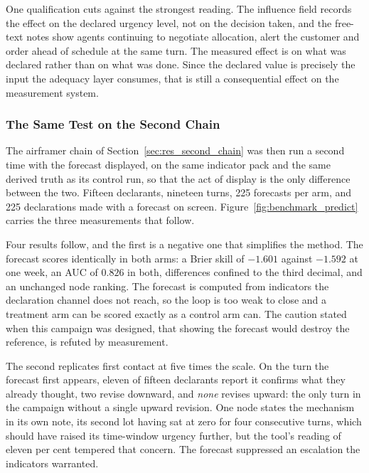 One qualification cuts against the strongest reading. The influence field records the effect
on the declared urgency level, not on the decision taken, and the free-text notes show agents
continuing to negotiate allocation, alert the customer and order ahead of schedule at the same
turn. The measured effect is on what was declared rather than on what was done. Since the
declared value is precisely the input the adequacy layer consumes, that is still a
consequential effect on the measurement system.

\subsubsection{The Same Test on the Second Chain}
\label{sec:res_display_second_chain}

The airframer chain of Section~\ref{sec:res_second_chain} was then run a second time with the
forecast displayed, on the same indicator pack and the same derived truth as its control run,
so that the act of display is the only difference between the two. Fifteen declarants,
nineteen turns, 225 forecasts per arm, and 225 declarations made with a forecast on screen.
Figure~\ref{fig:benchmark_predict} carries the three measurements that follow.

Four results follow, and the first is a negative one that simplifies the method. The forecast
scores identically in both arms: a Brier skill of $-1.601$ against $-1.592$ at one week, an AUC
of $0.826$ in both, differences confined to the third decimal, and an unchanged node ranking.
The forecast is computed from indicators the declaration channel does not reach, so the loop is
too weak to close and a treatment arm can be scored exactly as a control arm can. The caution
stated when this campaign was designed, that showing the forecast would destroy the reference,
is refuted by measurement.

The second replicates first contact at five times the scale. On the turn the forecast first
appears, eleven of fifteen declarants report it confirms what they already thought, two revise
downward, and \emph{none} revises upward: the only turn in the campaign without a single upward
revision. One node states the mechanism in its own note, its second lot having sat at zero for
four consecutive turns, which should have raised its time-window urgency further, but the
tool's reading of eleven per cent tempered that concern. The forecast suppressed an escalation
the indicators warranted.

